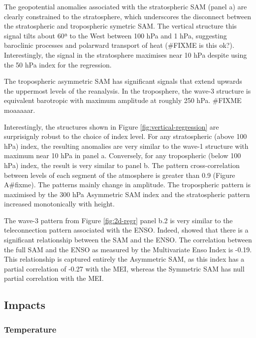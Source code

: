 \documentclass[]{ametsocV5}
\begin{document}
The geopotential anomalies associated with the stratospheric SAM (panel
a) are clearly constrained to the stratosphere, which underscores the
disconnect between the stratospheric and tropospheric symetric SAM. The
vertical structure this signal tilts about 60ª to the West between 100
hPa and 1 hPa, suggesting baroclinic processes and polarward transport
of heat (\#FIXME is this ok?). Interestingly, the signal in the
stratosphere maximises near 10 hPa despite using the 50 hPa index for
the regression.

The tropospheric asymmetric SAM has significant signals that extend
upwards the uppermost levels of the reanalysis. In the troposphere, the
wave-3 structure is equivalent barotropic with maximum amplitude at
roughly 250 hPa. \#FIXME moaaaaar.

Interestingly, the structures shown in Figure
\ref{fig:vertical-regression} are surprisignly robust to the choice of
index level. For any stratospheric (above 100 hPa) index, the resulting
anomalies are very similar to the wave-1 structure with maximum near 10
hPa in panel a. Conversely, for any tropospheric (below 100 hPa) index,
the result is very similar to panel b. The pattern cross-correlation
between levels of each segment of the atmosphere is greater than 0.9
(Figure A\#fixme). The patterns mainly change in amplitude. The
tropospheric pattern is maximised by the 300 hPa Asymmetric SAM index
and the stratospheric pattern increased monotonically with height.

The wave-3 pattern from Figure \ref{fig:2d-regr} panel b.2 is very
similar to the teleconnection pattern associated with the ENSO. Indeed,
\citet{fogt2011} showed that there is a significant relationship between
the SAM and the ENSO. The correlation between the full SAM and the ENSO
as measured by the Multivariate Enso Index \citep{wolter2011} is -0.19.
This relationship is captured entirely the Asymmetric SAM, as this index
has a partial correlation of -0.27 with the MEI, whereas the Symmetric
SAM has null partial correlation with the MEI.

\subsection{Impacts}

\subsubsection{Temperature}
\end{document}

